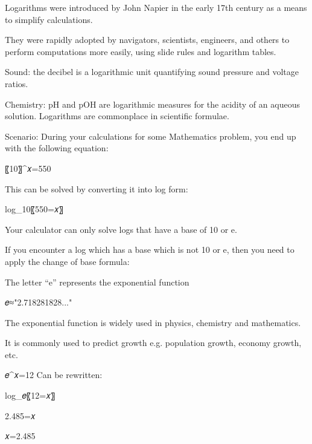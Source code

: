 


Logarithms were introduced by John Napier in the early 17th century as a means to simplify calculations. 

They were rapidly adopted by navigators, scientists, engineers, and others to perform computations more easily, using slide rules and logarithm tables. 


Sound: the decibel is a logarithmic unit quantifying sound pressure and voltage ratios. 


Chemistry: pH and pOH are logarithmic measures for the acidity of an aqueous solution. Logarithms are commonplace in scientific formulae.

Scenario: During your calculations for some Mathematics problem, you end up with the following equation:

〖10〗^𝑥=550

This can be solved by converting it into log form:

log_10⁡〖550=𝑥〗




Your calculator can only solve logs that have a base of 10 or e.

If you encounter a log which has a base which is not 10 or e, then you need to apply the change of base formula:


The letter “e” represents the exponential function

𝑒≈"2.718281828..."

The exponential function is widely used in physics, chemistry and mathematics.

It is commonly used to predict growth e.g. population growth, economy growth, etc.

𝑒^𝑥=12
Can be rewritten:

log_𝑒⁡〖12=𝑥〗

2.485=𝑥

𝑥=2.485
